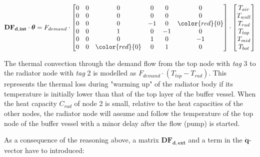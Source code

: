 \begin{equation}
	\mathbf{DF_{d,int}} \cdot \boldsymbol{\theta} = 
	F_{demand} \cdot
	\begin{bmatrix}
		0 & 0 & 0 & 0 & 0 & 0 \\
		0 & 0 & 0 & 0 & 0 & 0 \\
		0 & 0 & 0 & -1 & 0 & \color{red}{0} \\
		0 & 0 & 1 & 0 & -1 & 0 \\
		0 & 0 & 0 & 1 & 0 & -1 \\
		0 & 0 & \color{red}{0} & 0 & 1 & 0  
	\end{bmatrix}
	\cdot
	\begin{bmatrix}
		T_{air} \\
		T_{wall} \\
		T_{rad} \\
		T_{top} \\
		T_{mid} \\
		T_{bot}
	\end{bmatrix}
\end{equation}

The thermal convection through the demand flow from the top node with \emph{tag} 3 to the radiator node with \emph{tag} 2 is modelled as $F_{demand} \cdot (T_{top} - T_{rad})$. This represents the thermal loss during "warming up" of the radiator body if its temperature is initially lower than that of the top layer of the buffer vessel. When the heat capacity $C_{rad}$ of node 2 is small, relative to the heat capacities of the other nodes, the radiator node will assume and follow the temperature of the top node of the buffer vessel with a minor delay after the flow (pump) is started.

As a consequence of the reasoning above, a matrix $\mathbf{DF_{d,ext}}$  and a term in the $\mathbf{\dot{q}}$-vector have to introduced:

